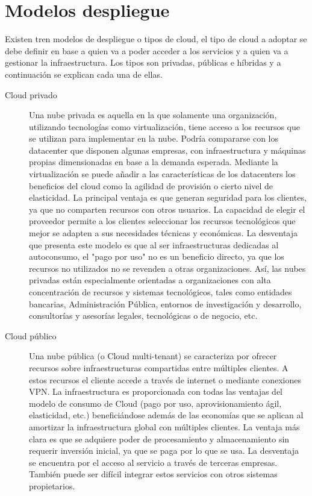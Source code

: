 \section{Modelos despliegue}

Existen tren modelos de despliegue o tipos de cloud, el tipo de cloud a adoptar se debe definir en base a quien va a poder acceder a los servicios y a quien va a gestionar la infraestructura. Los tipos son privadas, públicas e híbridas y a continuación se explican cada una de ellas.

\begin{description}
    \item[Cloud privado] Una nube privada es aquella en la que solamente una organización, utilizando tecnologías como virtualización, tiene acceso a los recursos que se utilizan para implementar en la nube. Podría compararse con los datacenter que disponen algunas empresas, con infraestructura y máquinas propias dimensionadas en base a la demanda esperada. Mediante la virtualización se puede añadir a las características de los datacenters los beneficios del cloud como la agilidad de provisión o cierto nivel de elasticidad.
        La principal ventaja es que generan seguridad para los clientes, ya que no comparten recursos con otros usuarios. La capacidad de elegir el proveedor permite a los clientes seleccionar los recursos tecnológicos que mejor se adapten a sus necesidades técnicas y económicas.
        La desventaja que presenta este modelo es que al ser infraestructuras dedicadas al autoconsumo, el "pago por uso" no es un beneficio directo, ya que los recursos no utilizados no se revenden a otras organizaciones.
        Así, las nubes privadas están especialmente orientadas a organizaciones con alta concentración de recursos y sistemas tecnológicos, tales como entidades bancarias, Administración Pública, entornos de investigación y desarrollo, consultorías y asesorías legales, tecnológicas o de negocio, etc.

    \item[Cloud público]
        Una nube pública (o Cloud multi-tenant) se caracteriza por ofrecer recursos  sobre infraestructuras compartidas entre múltiples clientes. A estos recursos el cliente accede a través de internet o mediante conexiones VPN. La infraestructura es proporcionada con todas las ventajas del modelo de consumo de Cloud (pago por uso, aprovisionamiento ágil, elasticidad, etc.) beneficiándose además de las economías que se aplican al amortizar la infraestructura global con múltiples clientes.
        La ventaja más clara es que se adquiere poder de procesamiento y almacenamiento sin requerir inversión inicial, ya que se paga por lo que se usa. La desventaja se encuentra por el acceso al servicio a través de terceras empresas. También puede ser difícil integrar estos servicios con otros sistemas propietarios.


\end{description}
